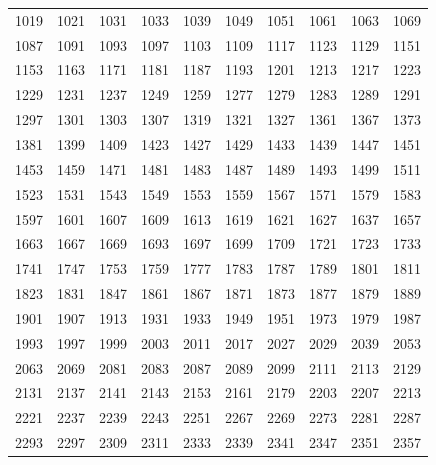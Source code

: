 \documentclass{article}
\begin{document}
\begin{tabular}{rrrrrrrrrr}
1019 & 1021 & 1031 & 1033 & 1039 & 1049 & 1051 & 1061 & 1063 & 1069 \\
1087 & 1091 & 1093 & 1097 & 1103 & 1109 & 1117 & 1123 & 1129 & 1151 \\
1153 & 1163 & 1171 & 1181 & 1187 & 1193 & 1201 & 1213 & 1217 & 1223 \\
1229 & 1231 & 1237 & 1249 & 1259 & 1277 & 1279 & 1283 & 1289 & 1291 \\
1297 & 1301 & 1303 & 1307 & 1319 & 1321 & 1327 & 1361 & 1367 & 1373 \\
1381 & 1399 & 1409 & 1423 & 1427 & 1429 & 1433 & 1439 & 1447 & 1451 \\
1453 & 1459 & 1471 & 1481 & 1483 & 1487 & 1489 & 1493 & 1499 & 1511 \\
1523 & 1531 & 1543 & 1549 & 1553 & 1559 & 1567 & 1571 & 1579 & 1583 \\
1597 & 1601 & 1607 & 1609 & 1613 & 1619 & 1621 & 1627 & 1637 & 1657 \\
1663 & 1667 & 1669 & 1693 & 1697 & 1699 & 1709 & 1721 & 1723 & 1733 \\
1741 & 1747 & 1753 & 1759 & 1777 & 1783 & 1787 & 1789 & 1801 & 1811 \\
1823 & 1831 & 1847 & 1861 & 1867 & 1871 & 1873 & 1877 & 1879 & 1889 \\
1901 & 1907 & 1913 & 1931 & 1933 & 1949 & 1951 & 1973 & 1979 & 1987 \\
1993 & 1997 & 1999 & 2003 & 2011 & 2017 & 2027 & 2029 & 2039 & 2053 \\
2063 & 2069 & 2081 & 2083 & 2087 & 2089 & 2099 & 2111 & 2113 & 2129 \\
2131 & 2137 & 2141 & 2143 & 2153 & 2161 & 2179 & 2203 & 2207 & 2213 \\
2221 & 2237 & 2239 & 2243 & 2251 & 2267 & 2269 & 2273 & 2281 & 2287 \\
2293 & 2297 & 2309 & 2311 & 2333 & 2339 & 2341 & 2347 & 2351 & 2357
\end{tabular}

\newpage

\end{document}
